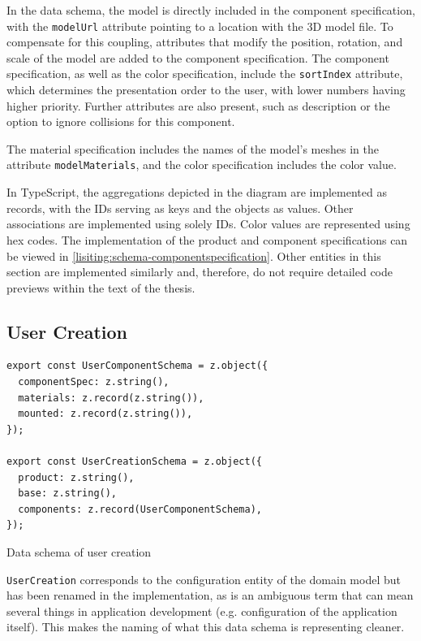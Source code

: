 In the data schema, the model is directly included in the component specification, with the \texttt{modelUrl} attribute pointing to a location with the 3D model file. To compensate for this coupling, attributes that modify the position, rotation, and scale of the model are added to the component specification. The component specification, as well as the color specification, include the \texttt{sortIndex} attribute, which determines the presentation order to the user, with lower numbers having higher priority. Further attributes are also present, such as description or the option to ignore collisions for this component.

The material specification includes the names of the model's meshes in the attribute \texttt{modelMaterials}, and the color specification includes the color value.

In TypeScript, the aggregations depicted in the  diagram are implemented as records, with the IDs serving as keys and the objects as values. Other associations are implemented using solely IDs. Color values are represented using hex codes. The implementation of the product and component specifications can be viewed in \autoref{lisiting:schema-componentspecification}. Other entities in this section are implemented similarly and, therefore, do not require detailed code previews within the text of the thesis.


\subsection{User Creation}

\begin{listing}[h]
\begin{verbatim}
export const UserComponentSchema = z.object({
  componentSpec: z.string(),
  materials: z.record(z.string()),
  mounted: z.record(z.string()),
});

export const UserCreationSchema = z.object({
  product: z.string(),
  base: z.string(),
  components: z.record(UserComponentSchema),
});
\end{verbatim}
\caption{Data schema of user creation}
\label{lisiting:schema-usercreation}
\end{listing}

\texttt{UserCreation} corresponds to the configuration entity of the domain model but has been renamed in the implementation, as  is an ambiguous term that can mean several things in application development (e.g. configuration of the application itself). This makes the naming of what this data schema is representing cleaner.

